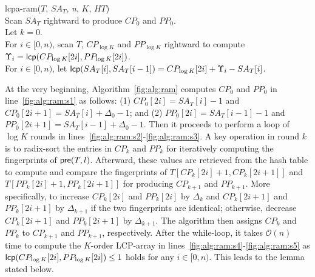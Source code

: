 \documentclass[10pt,journal,letterpaper,compsoc]{IEEEtran}
\begin{document}
\begin{CJK*}{GBK}{song}
\begin{algorithm}[hbtp!]
\caption{Compute $K$-Order $LCPA_T$ in RAM}
\label{fig:alg:ram}
lcpa-ram($T$, $SA_T$, {\em n}, $K$, $HT$){\\
\SetAlgoNoLine
Scan $SA_T$ rightward to produce $CP_0$ and $PP_0$. \label{fig:alg:ram:s1}\\
Let $k = 0$. \\
\While{$k < \log K$}{\label{fig:alg:ram:s2}
\Indentp{-1em}
Radix-sort $CP_k$ and $PP_k$ to produce $ICP_k$ and $IPP_k$. \\
For $i\in [0,n)$, scan $T$ rightward to compute the fingerprint of ${\sf pre}(T,i)$ and let $FP[0,i]=HT[i]$ if $i\in \{ICP_k[j] \cup IPP_k[j], j\in[0,2n)\}$. \\
For $i\in [0,n)$, scan $CP_k$ and $PP_k$ rightward to compute and compare $FP[CP_k[2i]+1,CP_k[2i+1]]$ and $FP[PP_k[2i]+1,PP_k[2i+1]]$ for generating $CP_{k+1}$ and $PP_{k+1}$. \\
Let $k = k +1$ and clear $HT$. \\
} \label{fig:alg:ram:s3}
For $i\in [0,n)$, scan $T$, $CP_{\log K}$ and $PP_{\log K}$ rightward to compute $\Upsilon_i = {\sf lcp}(CP_{\log K}[2i],PP_{\log K}[2i])$. \label{fig:alg:ram:s4}\\
For $i\in [0,n)$, let ${\sf lcp}(SA_T[i],SA_T[i-1])=CP_{\log K}[2i] +\Upsilon_i-SA_T[i]$. \label{fig:alg:ram:s5}\\
}
\end{algorithm}

At the very beginning, Algorithm~\ref{fig:alg:ram} computes $CP_0$ and $PP_0$ in line~\ref{fig:alg:ram:s1} as follows: (1) $CP_0[2i]=SA_T[i]-1$ and $CP_0[2i+1]=SA_T[i]+ \Delta_0 - 1$; and (2) $PP_0[2i]=SA_T[i-1]-1$ and $PP_0[2i+1]=SA_T[i-1]+ \Delta_0 - 1$. Then it proceeds to perform a loop of $\log K$ rounds in lines~\ref{fig:alg:ram:s2}-\ref{fig:alg:ram:s3}. A key operation in round $k$ is to radix-sort the entries in $CP_k$ and $PP_k$ for iteratively computing the fingerprints of ${\sf pre}(T,l)$. Afterward, these values are retrieved from the hash table to compute and compare the fingerprints of $T[CP_k[2i]+1,CP_k[2i+1]]$ and $T [PP_k[2i]+1,PP_k[2i+1]]$ for producing $CP_{k+1}$ and $PP_{k+1}$. More specifically, to increase $CP_{k}[2i]$ and $PP_{k}[2i]$ by $\Delta_k$ and $CP_{k}[2i+1]$ and $PP_{k}[2i+1]$ by $\Delta_{k+1}$ if the two fingerprints are identical; otherwise, decrease $CP_{k}[2i+1]$ and $PP_{k}[2i+1]$ by $\Delta_{k+1}$. The algorithm then assigns $CP_k$ and $PP_k$ to $CP_{k+1}$ and $PP_{k+1}$, respectively. After the while-loop, it takes $\mathcal{O}(n)$ time to compute the $K$-order LCP-array in lines~\ref{fig:alg:ram:s4}-\ref{fig:alg:ram:s5} as ${\sf lcp}(CP_{\log K}[2i],PP_{\log K}[2i]) \le 1$ holds for any $i \in [0,n)$. This leads to the lemma stated below.


\end{CJK*}
\end{document}

